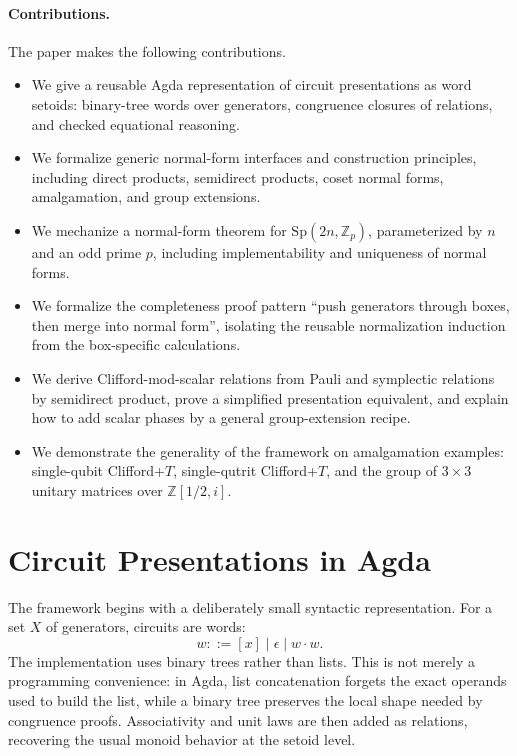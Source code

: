 \documentclass[acmsmall,screen,review,anonymous]{acmart}
\newcommand{\Agda}{Agda\xspace}
\newcommand{\Zp}{\mathbb{Z}_p}
\newcommand{\Sp}{\mathrm{Sp}}
\begin{document}
\paragraph{Contributions.}
The paper makes the following contributions.

\begin{itemize}[leftmargin=*]
\item We give a reusable \Agda representation of circuit presentations as word
  setoids: binary-tree words over generators, congruence closures of relations,
  and checked equational reasoning.
\item We formalize generic normal-form interfaces and construction principles,
  including direct products, semidirect products, coset normal forms,
  amalgamation, and group extensions.
\item We mechanize a normal-form theorem for \(\Sp(2n,\Zp)\), parameterized by
  \(n\) and an odd prime \(p\), including implementability and uniqueness of
  normal forms.
\item We formalize the completeness proof pattern ``push generators through
  boxes, then merge into normal form'', isolating the reusable normalization
  induction from the box-specific calculations.
\item We derive Clifford-mod-scalar relations from Pauli and symplectic
  relations by semidirect product, prove a simplified presentation equivalent,
  and explain how to add scalar phases by a general group-extension recipe.
\item We demonstrate the generality of the framework on amalgamation examples:
  single-qubit Clifford+\(T\), single-qutrit Clifford+\(T\), and the group of
  \(3\times3\) unitary matrices over \(\mathbb{Z}[1/2,i]\).
\end{itemize}

\section{Circuit Presentations in Agda}
\label{sec:framework}

The framework begins with a deliberately small syntactic representation. For a
set \(X\) of generators, circuits are words:
\[
  w ::= [x] \mid \epsilon \mid w \cdot w.
\]
The implementation uses binary trees rather than lists. This is not merely a
programming convenience: in \Agda, list concatenation forgets the exact operands
used to build the list, while a binary tree preserves the local shape needed by
congruence proofs. Associativity and unit laws are then added as relations,
recovering the usual monoid behavior at the setoid level.
\end{document}
